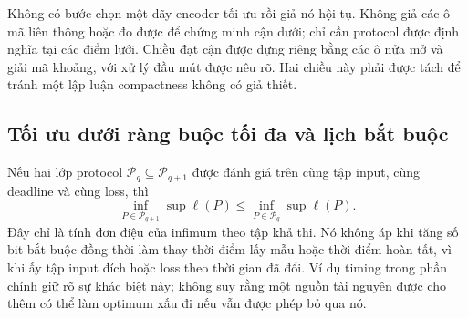 Không có bước chọn một dãy encoder tối ưu rồi giả nó hội tụ. Không giả các ô mã liên thông hoặc đo được để chứng minh cận dưới; chỉ cần protocol được định nghĩa tại các điểm lưới. Chiều đạt cận được dựng riêng bằng các ô nửa mở và giải mã khoảng, với xử lý đầu mút được nêu rõ. Hai chiều này phải được tách để tránh một lập luận compactness không có giả thiết.

\subsection{Tối ưu dưới ràng buộc tối đa và lịch bắt buộc}
Nếu hai lớp protocol $\mathcal P_q\subseteq\mathcal P_{q+1}$ được đánh giá trên cùng tập input, cùng deadline và cùng loss, thì
\[
\inf_{P\in\mathcal P_{q+1}}\sup\ell(P)\le
\inf_{P\in\mathcal P_q}\sup\ell(P).
\]
Đây chỉ là tính đơn điệu của infimum theo tập khả thi. Nó không áp khi tăng số bit bắt buộc đồng thời làm thay thời điểm lấy mẫu hoặc thời điểm hoàn tất, vì khi ấy tập input đích hoặc loss theo thời gian đã đổi. Ví dụ timing trong phần chính giữ rõ sự khác biệt này; không suy rằng một nguồn tài nguyên được cho thêm có thể làm optimum xấu đi nếu vẫn được phép bỏ qua nó.

